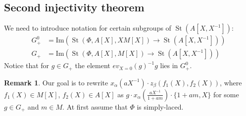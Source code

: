 \documentclass[oneside, 10pt]{amsart}
\theoremstyle{remark}
\theoremstyle{definition}
\newtheorem{rem}[lemma]{Remark}
\DeclareMathOperator{\St}{St}
\numberwithin{equation}{section}
\begin{document}
\subsection{Second injectivity theorem}
\begin{comment}
\[x_{\alpha}(aX^{-1}) x_{-\alpha}(mX) x_{\alpha}(-a(1+am)^{-1}X^{-1}) \cdot \{X, 1+am\} \in G_+.\]
$y := x_{\alpha}(aX^{-1}) x_{-\alpha}(mX) x_{\alpha}(-a(1+am)^{-1}X^{-1})$, 
$z = x_{-\alpha}(-m(1+am)^{-1}X) y h_{\alpha}((1+am)^{-1})$,
Using $\pi(z) = 1$ we get 
\begin{multline}z = z^{h_{ik}^{-1}(X)} = \\ x_{ji}(-m(1+am)^{-1}) x_{ij}(a) x_{ji}(m) \cdot x_{ij}(-a(1+am)^{-1})\{X, (1+am)^{-1}\} \cdot h_{ij}((1+am)^{-1}) \in G. \end{multline}
\end{comment}

We need to introduce notation for certain subgroups of $\St(A[X, X^{-1}])$:
\begin{align}
 G_+^0 & = \mathrm{Im}(\St(\Phi, A[X], XM[X]) \to \St(A[X, X^{-1}]))\\
 G_+   & = \mathrm{Im}(\St(\Phi, A[X], M[X]) \to \St(A[X, X^{-1}]))
\end{align}
Notice that for $ g\in G_+$ the element $ev_{X=0}(g)^{-1}g$ lies in $G_+^0$.

\begin{rem} Our goal is to rewrite $x_\alpha(aX^{-1}) \cdot z_\beta(f_1(X), f_2(X))$, where $f_1(X) \in M[X]$, $f_2(X) \in A[X]$ as
 $g \cdot x_\alpha(\frac{aX^{-1}}{1+am}) \cdot \{ 1 + am, X \}$ for some $g \in G_+$
 and $m \in M$. At first assume that $\Phi$ is simply-laced. \end{rem}
 
\end{document}

